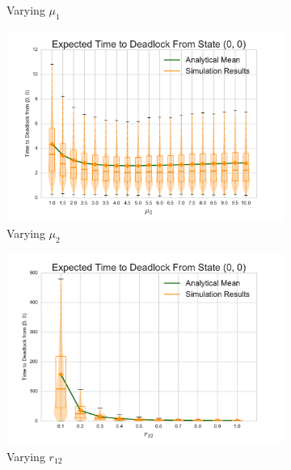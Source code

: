 \documentclass{article}
\numberwithin{equation}{section}
\begin{document}
\begin{figure}[!htbp]
\begin{subfigure}[b]{0.333\textwidth}
    \caption{Varying $\mu_1$}
    \label{fig:2Nms_mu1}
  \end{subfigure}
  \begin{subfigure}[b]{0.333\textwidth}
    \includegraphics[width=\textwidth]{images/varymu2_2Nms}
    \caption{Varying $\mu_2$}
    \label{fig:2Nms_mu2}
  \end{subfigure}
  \begin{subfigure}[b]{0.333\textwidth}
    \includegraphics[width=\textwidth]{images/varyr12_2Nms}
    \caption{Varying $r_{12}$}
    \label{fig:2Nms_r12}
  \end{subfigure}
  \begin{subfigure}[b]{0.333\textwidth}

\end{subfigure}
\end{figure}
\end{document}
